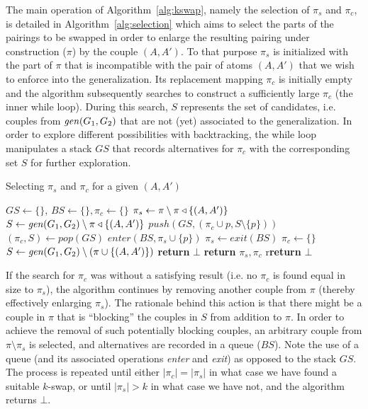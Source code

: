 The main operation of Algorithm~\ref{alg:kswap}, namely the selection of $\pi_s$ and $\pi_c$, is detailed in Algorithm~\ref{alg:selection} which aims to select the parts of the pairings to be swapped in order to enlarge the resulting pairing under construction ($\pi$) by the couple $(A,A')$.
To that purpose $\pi_s$ is initialized with the part of $\pi$ that is incompatible with the pair of atoms $(A,A')$ that we wish to enforce into the generalization. Its replacement mapping $\pi_c$ is initially empty and the algorithm subsequently searches to construct a sufficiently large $\pi_c$ (the inner while loop). During this search, $S$ represents the set of candidates, i.e. couples from $\mathit{gen}(G_1,G_2)$ that are not (yet) associated to the generalization. In order to explore different possibilities with backtracking, the while loop manipulates a stack $GS$ that records alternatives for $\pi_c$ with the corresponding set $S$ for further exploration. 
\begin{algorithm}[hbtp]
\caption{Selecting $\pi_s$ and $\pi_c$ for a given $(A,A')$}
\label{alg:selection}
	\begin{algorithmic}
		\State $GS \gets \{\}$,  $BS \gets \{\}, \pi_c \gets\{\}$
		\State $\pi_s \gets \pi\setminus\pi\triangleleft\{(A,A')\}$
		\State $S \gets \mathit{gen}(G_1, G_2) \setminus\pi\triangleleft\{(A,A')\}$
					\State $push(GS, (\pi_c\cup p, S\setminus\{p\}))$
				\EndFor
				\State $(\pi_c, S)\gets pop(GS)$
			\EndWhile
					\State $enter(BS, \pi_s\cup\{p\})$
				\EndFor
					\State $\pi_s\gets exit(BS)$
					\State $\pi_c\gets\{\}$
					\State $S\gets \mathit{gen}(G_1, G_2)\setminus(\pi\cup \{(A,A')\})$
				\Else
					\State \textbf{return} $\bot$
				\EndIf
			\EndIf
		\EndWhile
			\State \textbf{return} $\pi_s, \pi_c$
		\EndIf
			\State r\textbf{return} $\bot$
	\end{algorithmic}
\end{algorithm}

If the search for $\pi_c$ was without a satisfying result (i.e. no $\pi_c$ is found equal in size to $\pi_s$), the algorithm continues by removing another couple from $\pi$ (thereby effectively enlarging $\pi_s$). The rationale behind this action is that there might be a couple in $\pi$ that is ``blocking'' the couples in $S$ from addition to $\pi$. In order to achieve the removal of such potentially blocking couples, an arbitrary couple from $\pi\setminus\pi_s$ is selected, and alternatives are recorded in a queue ($BS$). Note the use of a queue (and its associated operations \textit{enter} and \textit{exit}) as opposed to the stack $GS$.
%
The process is repeated until either $|\pi_c|=|\pi_s|$ in what case we have found a suitable $k$-swap, or until $|\pi_s|>k$ in what case we have not, and the algorithm returns $\bot$. %

